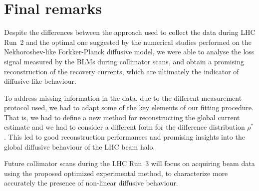 \section{Final remarks}\label{sec:4:remarks}
%
Despite the differences between the approach used to collect the data during LHC Run~2 and the optimal one suggested by the numerical studies performed on the Nekhoroshev-like Forkker-Planck diffusive model, we were able to analyse the loss signal measured by the BLMs during collimator scans, and obtain a promising reconstruction of the recovery currents, which are ultimately the indicator of diffusive-like behaviour.

To address missing information in the data, due to the different measurement protocol used, we had to adapt some of the key elements of our fitting procedure. That is, we had to define a new method for reconstructing the global current estimate and we had to consider a different form for the difference distribution $\rho^\ast$. This led to good reconstruction performances and promising insights into the global diffusive behaviour of the LHC beam halo.

Future collimator scans during the LHC Run~3 will focus on acquiring beam data using the proposed optimized experimental method, to characterize more accurately the presence of non-linear diffusive behaviour. 
